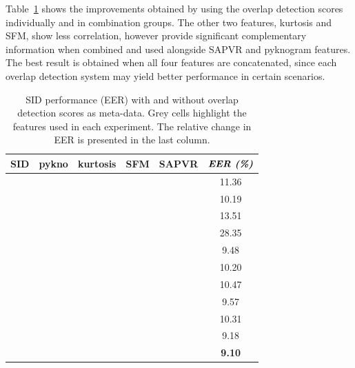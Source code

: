 {Table~\ref{tab:sid_stack_results} shows the improvements obtained by using the overlap detection scores individually and in combination groups. 
The other two features, kurtosis and SFM, show less correlation, however provide significant complementary information when combined and used alongside SAPVR and pyknogram features. 
The best result is obtained when all four features are concatenated, since each overlap detection system may yield better performance in certain scenarios.  


\begin{table}[t]
	\begin{tabular}{|c|c|c|c|c|c|}
		\hline
		SID & pykno & kurtosis & SFM & SAPVR & $\textit{\textbf{EER (\%)}}$ \\ \hline
		\cellcolor[HTML]{C0C0C0}{\color[HTML]{343434} } \checkmark &  &  &  &  & 11.36\\ \hline \hline
		\cellcolor[HTML]{C0C0C0} \checkmark & \cellcolor[HTML]{C0C0C0} \checkmark &  &  &  & 10.19 \\ \hline
		\cellcolor[HTML]{C0C0C0} \checkmark &  & \cellcolor[HTML]{C0C0C0} \checkmark &  &  & 13.51 \\ \hline
		\cellcolor[HTML]{C0C0C0}{\color[HTML]{343434} } \checkmark &  &  & \cellcolor[HTML]{C0C0C0}{\color[HTML]{343434} } \checkmark &  & 28.35 \\ \hline
		\cellcolor[HTML]{C0C0C0} \checkmark &  &  &  & \cellcolor[HTML]{C0C0C0} \checkmark & 9.48 \\ \hline \hline
		\cellcolor[HTML]{C0C0C0}{\color[HTML]{343434} } \checkmark & \cellcolor[HTML]{C0C0C0} \checkmark & \cellcolor[HTML]{C0C0C0}{\color[HTML]{343434} } \checkmark &  &  & 10.20 \\ \hline
		\cellcolor[HTML]{C0C0C0} \checkmark & \cellcolor[HTML]{C0C0C0} \checkmark &  & \cellcolor[HTML]{C0C0C0} \checkmark &  & 10.47 \\ \hline
		\cellcolor[HTML]{C0C0C0} \checkmark & \cellcolor[HTML]{C0C0C0} \checkmark &  &  & \cellcolor[HTML]{C0C0C0} \checkmark & 9.57 \\ \hline \hline
		\cellcolor[HTML]{C0C0C0} \checkmark & \cellcolor[HTML]{C0C0C0} \checkmark & \cellcolor[HTML]{C0C0C0} \checkmark & \cellcolor[HTML]{C0C0C0} \checkmark &  & 10.31 \\ \hline
		\cellcolor[HTML]{C0C0C0} \checkmark & \cellcolor[HTML]{C0C0C0} \checkmark & \cellcolor[HTML]{C0C0C0} \checkmark & \cellcolor[HTML]{FFFFFF} & \cellcolor[HTML]{C0C0C0} \checkmark & 9.18 \\ \hline
		\cellcolor[HTML]{C0C0C0} \checkmark & \cellcolor[HTML]{C0C0C0} \checkmark & \cellcolor[HTML]{C0C0C0} \checkmark & \cellcolor[HTML]{C0C0C0} \checkmark & \cellcolor[HTML]{C0C0C0} \checkmark & {\bf 9.10}\\ \hline
	\end{tabular}
	\caption{SID performance (EER) with and without overlap detection scores as meta-data. Grey cells highlight the features used in each experiment. The relative change in EER is presented in the last column.}
	\label{tab:sid_stack_results}
	\vspace{-5mm}
\end{table}

}
